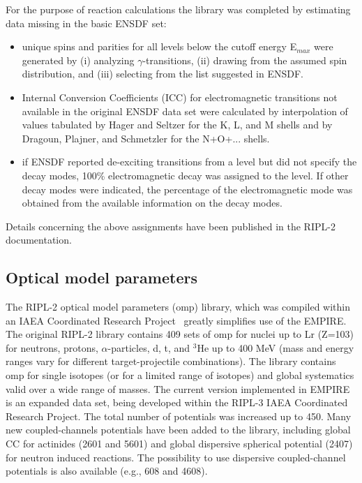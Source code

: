 \documentclass[twocolumn,amsmath,amssymb,10pt,groupedaddress,a4paper]{revtex4}
\begin{document}
For the purpose of reaction calculations the library was completed
by estimating data missing in the basic ENSDF set:
\begin{itemize}
\item unique spins and parities for all levels below the cutoff energy E$_{{max}}$
were generated by (i) analyzing $\gamma$-transitions, (ii)
drawing from the assumed spin distribution, and (iii) selecting
from the list suggested in ENSDF.
\item Internal Conversion Coefficients (ICC) for electromagnetic transitions
not available in the original ENSDF data set were calculated by
interpolation of values tabulated
by Hager and Seltzer for the K, L, and M shells and by Dragoun, Plajner,
and Schmetzler for the N+O+... shells.
\item if ENSDF reported de-exciting transitions from a level but did not
specify the decay modes, 100\% electromagnetic decay was assigned
to the level. If other decay modes were indicated, the percentage
of the electromagnetic mode was obtained from the available information
on the decay modes.
\end{itemize}
Details concerning the above assignments have been published in the
RIPL-2 documentation.

\subsection{Optical model parameters\label{sec:RIPLomp}}
The RIPL-2 optical model parameters
(omp) library, which was compiled within an IAEA Coordinated Research
Project~\cite{RIPL2} greatly simplifies use of the EMPIRE. The original RIPL-2
library contains 409 sets of omp for nuclei
up to Lr (Z=103) for neutrons, protons, $\alpha$-particles, d, t,
and $^{3}$He up to 400 MeV (mass and energy ranges vary for different
target-projectile combinations). The library contains omp for single
isotopes (or for a limited range of isotopes) and global systematics
valid over a wide range of masses. The current version implemented in EMPIRE
is an expanded data set, being developed within the RIPL-3
IAEA Coordinated Research Project. The total number of potentials was
increased up to 450. Many new coupled-channels potentials have been added
to the library, including global CC for actinides (2601 and 5601) and
global dispersive spherical potential (2407) for neutron induced reactions.
The possibility to use dispersive coupled-channel potentials is also available
(e.g., 608 and 4608).
\end{document}
